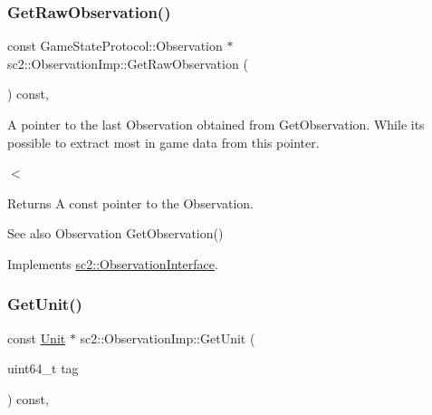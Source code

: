 \mbox{\label{classsc2_1_1_observation_imp_ab77543fa1b95c5e348343129a21c84a3}} 
\subsubsection{\texorpdfstring{Get\+Raw\+Observation()}{GetRawObservation()}}
{\footnotesize\ttfamily const Game\+State\+Protocol\+::\+Observation $\ast$ sc2\+::\+Observation\+Imp\+::\+Get\+Raw\+Observation (\begin{DoxyParamCaption}{ }\end{DoxyParamCaption}) const\hspace{0.3cm}{\ttfamily [final]}, {\ttfamily [virtual]}}



A pointer to the last Observation obtained from Get\+Observation. While it\textquotesingle{}s possible to extract most in game data from this pointer. 

$<$ \begin{DoxyReturn}{Returns}
A const pointer to the Observation. 
\end{DoxyReturn}
\begin{DoxySeeAlso}{See also}
Observation Get\+Observation() 
\end{DoxySeeAlso}


Implements \hyperlink{classsc2_1_1_observation_interface_af3efed53a1a81ccadf236bab386dd108}{sc2\+::\+Observation\+Interface}.

\mbox{\label{classsc2_1_1_observation_imp_abb210dcc3b4ac518543902d97aee4b10}} 
\subsubsection{\texorpdfstring{Get\+Unit()}{GetUnit()}}
{\footnotesize\ttfamily const \hyperlink{classsc2_1_1_unit}{Unit} $\ast$ sc2\+::\+Observation\+Imp\+::\+Get\+Unit (\begin{DoxyParamCaption}\item[{uint64\+\_\+t}]{tag }\end{DoxyParamCaption}) const\hspace{0.3cm}{\ttfamily [final]}, {\ttfamily [virtual]}}

